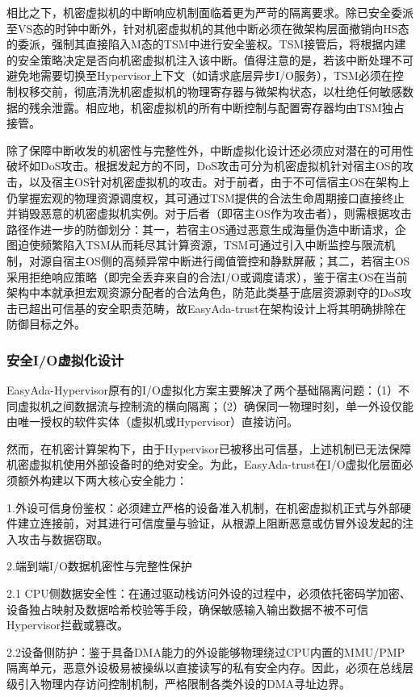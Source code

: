 \documentclass[master, vlined, review]{DissertUESTC}
\begin{document}
	相比之下，机密虚拟机的中断响应机制面临着更为严苛的隔离要求。除已安全委派至VS态的时钟中断外，针对机密虚拟机的其他中断必须在微架构层面撤销向HS态的委派，强制其直接陷入M态的TSM中进行安全鉴权。TSM接管后，将根据内建的安全策略决定是否向机密虚拟机注入该中断。值得注意的是，若该中断处理不可避免地需要切换至Hypervisor上下文（如请求底层异步I/O服务），TSM必须在控制权移交前，彻底清洗机密虚拟机的物理寄存器与微架构状态，以杜绝任何敏感数据的残余泄露。相应地，机密虚拟机的所有中断控制与配置寄存器均由TSM独占接管。
	
	除了保障中断收发的机密性与完整性外，中断虚拟化设计还必须应对潜在的可用性破坏如DoS攻击。根据发起方的不同，DoS攻击可分为机密虚拟机针对宿主OS的攻击，以及宿主OS针对机密虚拟机的攻击。对于前者，由于不可信宿主OS在架构上仍掌握宏观的物理资源调度权，其可通过TSM提供的合法生命周期接口直接终止并销毁恶意的机密虚拟机实例。对于后者（即宿主OS作为攻击者），则需根据攻击路径作进一步的防御划分：其一，若宿主OS通过恶意生成海量伪造中断请求，企图迫使频繁陷入TSM从而耗尽其计算资源，TSM可通过引入中断监控与限流机制，对源自宿主OS侧的高频异常中断进行阈值管控和静默屏蔽；其二，若宿主OS采用拒绝响应策略（即完全丢弃来自的合法I/O或调度请求），鉴于宿主OS在当前架构中本就承担宏观资源分配者的合法角色，防范此类基于底层资源剥夺的DoS攻击已超出可信基的安全职责范畴，故EasyAda-trust在架构设计上将其明确排除在防御目标之外。
	
	\subsubsection{安全I/O虚拟化设计}
	EasyAda-Hypervisor原有的I/O虚拟化方案主要解决了两个基础隔离问题：（1）不同虚拟机之间数据流与控制流的横向隔离；（2）确保同一物理时刻，单一外设仅能由唯一授权的软件实体（虚拟机或Hypervisor）直接访问。
	
	然而，在机密计算架构下，由于Hypervisor已被移出可信基，上述机制已无法保障机密虚拟机使用外部设备时的绝对安全。为此，EasyAda-trust在I/O虚拟化层面必须额外构建以下两大核心安全能力：
	
	1.外设可信身份鉴权：必须建立严格的设备准入机制，在机密虚拟机正式与外部硬件建立连接前，对其进行可信度量与验证，从根源上阻断恶意或仿冒外设发起的注入攻击与数据窃取。
	
	2.端到端I/O数据机密性与完整性保护
	
	2.1 CPU侧数据安全性：在通过驱动栈访问外设的过程中，必须依托密码学加密、设备独占映射及数据哈希校验等手段，确保敏感输入输出数据不被不可信Hypervisor拦截或篡改。
	
	2.2设备侧防护：鉴于具备DMA能力的外设能够物理绕过CPU内置的MMU/PMP隔离单元，恶意外设极易被操纵以直接读写的私有安全内存。因此，必须在总线层级引入物理内存访问控制机制，严格限制各类外设的DMA寻址边界。
	
\end{document}
